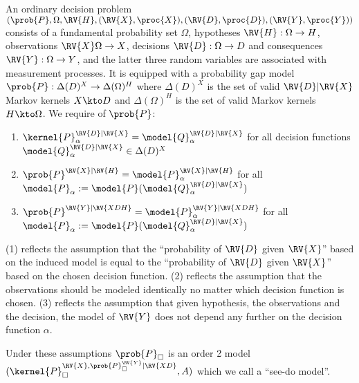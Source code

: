 \begin{definition}
An ordinary decision problem $(\prob{P},\Omega,\RV{H},(\RV{X},\proc{X}),(\RV{D},\proc{D}),(\RV{Y},\proc{Y}))$ consists of a fundamental probability set $\Omega$, hypotheses $\RV{H}:\Omega\to H$, observations $\RV{X}\Omega\to X$, decisions $\RV{D}:\Omega\to D$ and consequences $\RV{Y}:\Omega\to Y$, and the latter three random variables are associated with measurement processes. It is equipped with a probability gap model $\prob{P}:\Delta(D)^X\to \Delta(\Omega)^H$ where $\Delta(D)^X$ is the set of valid $\RV{D}|\RV{X}$ Markov kernels $X\kto D$ and $\Delta(\Omega)^H$ is the set of valid Markov kernels $H\kto \Omega$. We require of $\prob{P}$:
\begin{enumerate}
    \item $\kernel{P}_\alpha^{\RV{D}|\RV{X}}=\model{Q}_\alpha^{\RV{D}|\RV{X}}$ for all decision functions $\model{Q}_\alpha^{\RV{D}|\RV{X}}\in \Delta(D)^X$
    \item $\prob{P}^{\RV{X}|\RV{H}}=\model{P}_\alpha^{\RV{X}|\RV{H}}$ for all $\model{P}_\alpha:=\model{P}(\model{Q}_\alpha^{\RV{D}|\RV{X}})$
    \item $\prob{P}^{\RV{Y}|\RV{XDH}}=\model{P}_\alpha^{\RV{Y}|\RV{XDH}}$ for all $\model{P}_\alpha:=\model{P}(\model{Q}_\alpha^{\RV{D}|\RV{X}})$
\end{enumerate}
\end{definition}

(1) reflects the assumption that the ``probability of $\RV{D}$ given $\RV{X}$'' based on the induced model is equal to the ``probability of $\RV{D}$ given $\RV{X}$'' based on the chosen decision function. (2) reflects the assumption that the observations should be modeled identically no matter which decision function is chosen. (3) reflects the assumption that given hypothesis, the observations and the decision, the model of $\RV{Y}$ does not depend any further on the decision function $\alpha$.

Under these assumptions $\prob{P}_\square$ is an order 2 model $(\kernel{P}_\square^{\RV{X},\prob{P}_\square^\RV{Y}|\RV{XD}},A)$ which we call a ``see-do model''.


